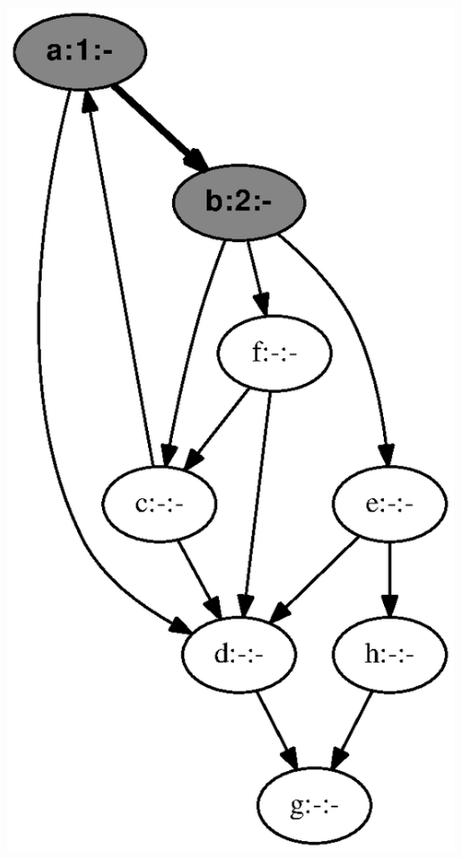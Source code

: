 \documentclass{article}
\begin{document}
\vspace{1em}
\includegraphics[height=.3\textheight]{dfs_directed_classroom_02.eps}
\vspace{1em}
\end{document}
